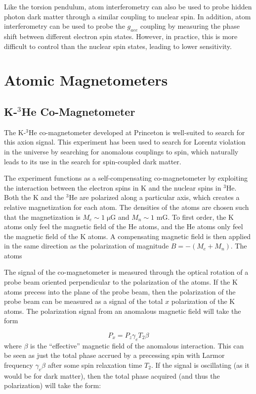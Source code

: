 \documentclass[aps,prd,final,letterpaper]{revtex4}
\begin{document}
Like the torsion pendulum, atom interferometry can also be used to probe hidden photon dark matter through a similar coupling to nuclear spin. In addition, atom interferometry can be used to probe the $g_{aee}$ coupling by measuring the phase shift between different electron spin states. However, in practice, this is more difficult to control than the nuclear spin states, leading to lower sensitivity.


\section{Atomic Magnetometers}

\subsection{K-$^{3}$He Co-Magnetometer}

The K-$^{3}$He co-magnetometer developed at Princeton is well-suited to search for this axion signal. This experiment has been used to search for Lorentz violation in the universe by searching for anomalous couplings to spin, which naturally leads to its use in the search for spin-coupled dark matter. 

The experiment functions as a self-compensating co-magnetometer by exploiting the interaction between the electron spins in K and the nuclear spins in $^{3}$He. Both the K and the $^3$He are polarized along a particular axis, which creates a relative magnetization for each atom. The densities of the atoms are chosen such that the magnetization is $M_e \sim 1 \; \mathrm{\mu G}$ and $M_n \sim 1$ mG. To first order, the K atoms only feel the magnetic field of the He atoms, and the He atoms only feel the magnetic field of the K atoms. A compensating magnetic field is then applied in the same direction as the polarization of magnitude $B = -(M_e + M_n)$. The atoms 

The signal of the co-magnetometer is measured through the optical rotation of a probe beam oriented perpendicular to the polarization of the atoms. If the K atoms precess into the plane of the probe beam, then the polarization of the probe beam can be measured as a signal of the total $x$ polarization of the K atoms. The polarization signal from an anomalous magnetic field will take the form 

\begin{equation}
P_x = P_z\gamma_e T_2\beta
\end{equation}
where $\beta$ is the ``effective'' magnetic field of the anomalous interaction. This can be seen as just the total phase accrued by a precessing spin with Larmor frequency $\gamma_e \beta$ after some spin relaxation time $T_2$. If the signal is oscillating (as it would be for dark matter), then the total phase acquired (and thus the polarization) will take the form:
\end{document}
